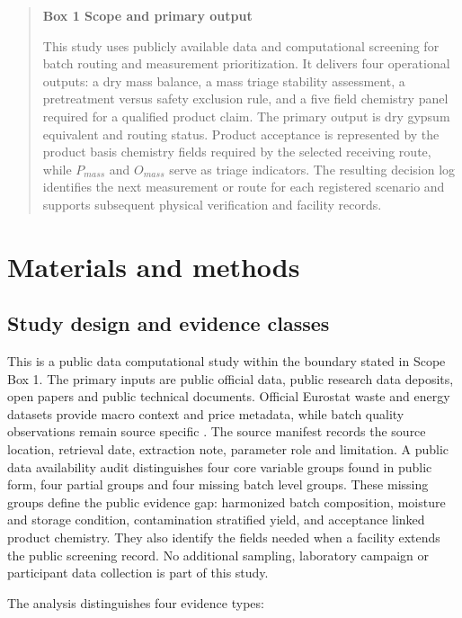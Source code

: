 \documentclass[pdflatex,sn-basic]{sn-jnl}
\begin{document}
\begin{quote}
\textbf{Box 1 \textbar{} Scope and primary output}

This study uses publicly available data and computational screening for batch routing and measurement prioritization. It delivers four operational outputs: a dry mass balance, a mass triage stability assessment, a pretreatment versus safety exclusion rule, and a five field chemistry panel required for a qualified product claim. The primary output is dry gypsum equivalent and routing status. Product acceptance is represented by the product basis chemistry fields required by the selected receiving route, while \(P_{mass}\) and \(O_{mass}\) serve as triage indicators. The resulting decision log identifies the next measurement or route for each registered scenario and supports subsequent physical verification and facility records.
\end{quote}

\section{Materials and methods}\label{materials-and-methods}

\subsection{Study design and evidence classes}\label{study-design-and-evidence-classes}

This is a public data computational study within the boundary stated in Scope Box 1. The primary inputs are public official data, public research data deposits, open papers and public technical documents. Official Eurostat waste and energy datasets provide macro context and price metadata, while batch quality observations remain source specific \citep{eurostatW121,eurostatEnergyPrices}. The source manifest records the source location, retrieval date, extraction note, parameter role and limitation. A public data availability audit distinguishes four core variable groups found in public form, four partial groups and four missing batch level groups. These missing groups define the public evidence gap: harmonized batch composition, moisture and storage condition, contamination stratified yield, and acceptance linked product chemistry. They also identify the fields needed when a facility extends the public screening record. No additional sampling, laboratory campaign or participant data collection is part of this study.

The analysis distinguishes four evidence types:
\end{document}
